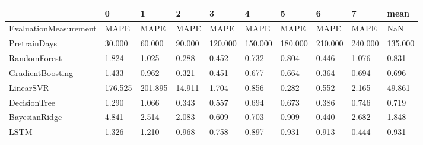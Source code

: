 \begin{tabular}{llllllllll}
\toprule
{} &       0 &       1 &      2 &       3 &       4 &       5 &       6 &       7 &    mean \\
\midrule
EvaluationMeasurement &    MAPE &    MAPE &   MAPE &    MAPE &    MAPE &    MAPE &    MAPE &    MAPE &     NaN \\
PretrainDays          &  30.000 &  60.000 & 90.000 & 120.000 & 150.000 & 180.000 & 210.000 & 240.000 & 135.000 \\
RandomForest          &   1.824 &   1.025 &  0.288 &   0.452 &   0.732 &   0.804 &   0.446 &   1.076 &   0.831 \\
GradientBoosting      &   1.433 &   0.962 &  0.321 &   0.451 &   0.677 &   0.664 &   0.364 &   0.694 &   0.696 \\
LinearSVR             & 176.525 & 201.895 & 14.911 &   1.704 &   0.856 &   0.282 &   0.552 &   2.165 &  49.861 \\
DecisionTree          &   1.290 &   1.066 &  0.343 &   0.557 &   0.694 &   0.673 &   0.386 &   0.746 &   0.719 \\
BayesianRidge         &   4.841 &   2.514 &  2.083 &   0.609 &   0.703 &   0.909 &   0.440 &   2.682 &   1.848 \\
LSTM                  &   1.326 &   1.210 &  0.968 &   0.758 &   0.897 &   0.931 &   0.913 &   0.444 &   0.931 \\
\bottomrule
\end{tabular}
